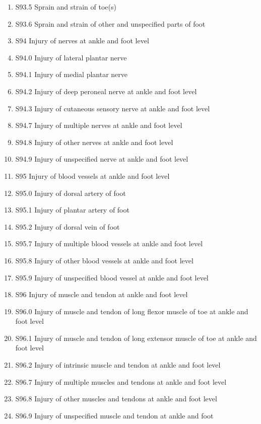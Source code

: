 \documentclass[
]{scrartcl}
\begin{document}
\begin{itemize}
\begin{enumerate}
  \item
    S93.5 Sprain and strain of toe(s)
  \item
    S93.6 Sprain and strain of other and unspecified parts of foot
  \item
    S94 Injury of nerves at ankle and foot level
  \item
    S94.0 Injury of lateral plantar nerve
  \item
    S94.1 Injury of medial plantar nerve
  \item
    S94.2 Injury of deep peroneal nerve at ankle and foot level
  \item
    S94.3 Injury of cutaneous sensory nerve at ankle and foot level
  \item
    S94.7 Injury of multiple nerves at ankle and foot level
  \item
    S94.8 Injury of other nerves at ankle and foot level
  \item
    S94.9 Injury of unspecified nerve at ankle and foot level
  \item
    S95 Injury of blood vessels at ankle and foot level
  \item
    S95.0 Injury of dorsal artery of foot
  \item
    S95.1 Injury of plantar artery of foot
  \item
    S95.2 Injury of dorsal vein of foot
  \item
    S95.7 Injury of multiple blood vessels at ankle and foot level
  \item
    S95.8 Injury of other blood vessels at ankle and foot level
  \item
    S95.9 Injury of unspecified blood vessel at ankle and foot level
  \item
    S96 Injury of muscle and tendon at ankle and foot level
  \item
    S96.0 Injury of muscle and tendon of long flexor muscle of toe at
    ankle and foot level
  \item
    S96.1 Injury of muscle and tendon of long extensor muscle of toe at
    ankle and foot level
  \item
    S96.2 Injury of intrinsic muscle and tendon at ankle and foot level
  \item
    S96.7 Injury of multiple muscles and tendons at ankle and foot level
  \item
    S96.8 Injury of other muscles and tendons at ankle and foot level
  \item
    S96.9 Injury of unspecified muscle and tendon at ankle and foot

\end{enumerate}
\end{itemize}
\end{document}
